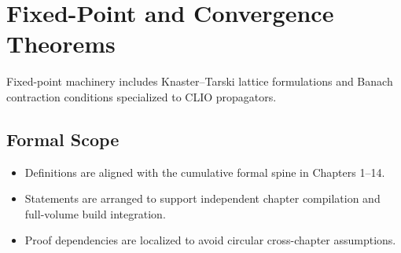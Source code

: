 \documentclass[../../clio.tex]{subfiles}
\begin{document}
\chapter{Fixed-Point and Convergence Theorems}
\label{apx:c-fixed-points}

Fixed-point machinery includes Knaster--Tarski lattice formulations and Banach contraction conditions specialized to CLIO propagators.

\section{Formal Scope}
\begin{itemize}
  \item Definitions are aligned with the cumulative formal spine in Chapters 1--14.
  \item Statements are arranged to support independent chapter compilation and full-volume build integration.
  \item Proof dependencies are localized to avoid circular cross-chapter assumptions.
\end{itemize}
\end{document}

